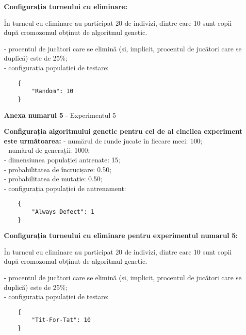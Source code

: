 \textbf{Configurația turneului cu eliminare: }

În turneul cu eliminare au participat 20 de indivizi, dintre care 10 sunt copii după cromozomul obținut de algoritmul genetic. 

- procentul de jucători care se elimină (și, implicit, procentul de jucători care se duplică) este de 25\%;\\
- configurația populației de testare:\\
\begin{center}
	\begin{lstlisting}
	{
		"Random": 10
	}
	\end{lstlisting}
\end{center}

\clearpage

\begin{center}
	\textbf{Anexa numarul 5} - Experimentul 5
\end{center}

\textbf{Configurația algoritmului genetic pentru cel de al cincilea experiment este următoarea: }
- numărul de runde jucate în fiecare meci: 100;\\
- numărul de generații: 1000;\\
- dimensiunea populației antrenate: 15;\\
- probabilitatea de încrucișare: 0.50;\\
- probabilitatea de mutație: 0.50;\\
- configurația populației de antrenament:\\
\begin{center}
	\begin{lstlisting}
	{
		"Always Defect": 1
	}
	\end{lstlisting}
\end{center}

\textbf{Configurația turneului cu eliminare pentru experimentul numarul 5: }

În turneul cu eliminare au participat 20 de indivizi, dintre care 10 sunt copii după cromozomul obținut de algoritmul genetic. 

- procentul de jucători care se elimină (și, implicit, procentul de jucători care se duplică) este de 25\%;\\
- configurația populației de testare:\\
\begin{center}
	\begin{lstlisting}
	{
		"Tit-For-Tat": 10
	}
	\end{lstlisting}
\end{center}

